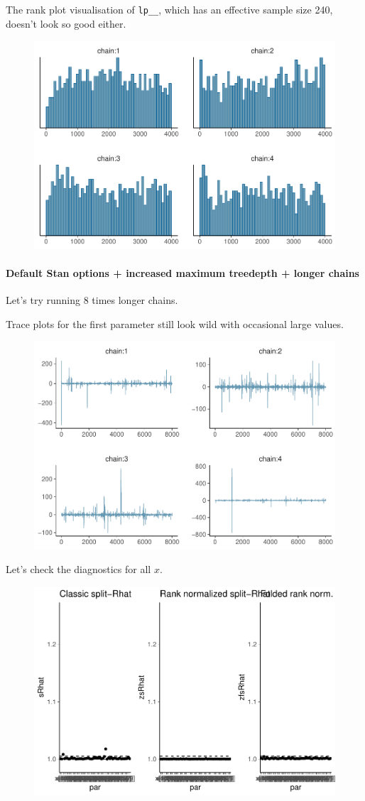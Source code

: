 \documentclass[american,]{article}
\let\oldparagraph\paragraph
\renewcommand{\paragraph}[1]{\oldparagraph{#1}\mbox{}}
\begin{document}
The rank plot visualisation of \texttt{lp\_\_}, which has an effective
sample size 240, doesn't look so good either.

\begin{figure}[tp]
  \centering
  \includegraphics[width=0.6\linewidth]{graphics/hist-fit-nom-td20-lp-1.pdf}
\end{figure}

\hypertarget{default-stan-options-increased-maximum-treedepth-longer-chains}{%
\paragraph{Default Stan options + increased maximum treedepth + longer
chains}\label{default-stan-options-increased-maximum-treedepth-longer-chains}}

Let's try running 8 times longer chains.

Trace plots for the first parameter still look wild with occasional
large values.

\begin{figure}[tp]
  \centering
  \includegraphics[width=0.6\linewidth]{graphics/trace-fit-nom-td20l-1.pdf}
\end{figure}

Let's check the diagnostics for all \(x\).

\begin{figure}[tp]
  \centering
  \includegraphics[width=0.6\linewidth]{graphics/rhat-fit-nom-td20l-1.pdf}
\end{figure}
\end{document}
